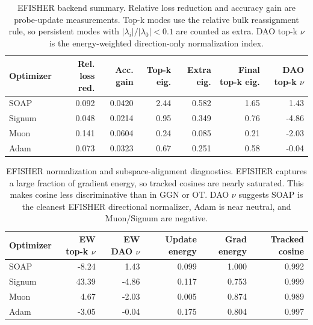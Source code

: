 \documentclass[11pt]{article}
\begin{document}
\begin{table}[htbp]
\centering
\small
\begin{tabular}{lrrrrrr}
\toprule
Optimizer & Rel. loss red. & Acc. gain & Top-k eig. & Extra eig. & Final top-k eig. & DAO top-k $\nu$ \\
\midrule
SOAP & 0.092 & 0.0420 & 2.44 & 0.582 & 1.65 & 1.43 \\
Signum & 0.048 & 0.0214 & 0.95 & 0.349 & 0.76 & -4.86 \\
Muon & 0.141 & 0.0604 & 0.24 & 0.085 & 0.21 & -2.03 \\
Adam & 0.073 & 0.0323 & 0.67 & 0.251 & 0.58 & -0.04 \\
\bottomrule
\end{tabular}
\caption{EFISHER backend summary. Relative loss reduction and accuracy gain are probe-update measurements. Top-k modes use the relative bulk reassignment rule, so persistent modes with $|\lambda_i|/|\lambda_0|<0.1$ are counted as extra. DAO top-k $\nu$ is the energy-weighted direction-only normalization index.}
\label{tab:efisher-summary}
\end{table}

\begin{table}[htbp]
\centering
\small
\begin{tabular}{lrrrrr}
\toprule
Optimizer & EW top-k $\nu$ & EW DAO $\nu$ & Update energy & Grad energy & Tracked cosine \\
\midrule
SOAP & -8.24 & 1.43 & 0.099 & 1.000 & 0.992 \\
Signum & 43.39 & -4.86 & 0.117 & 0.753 & 0.999 \\
Muon & 4.67 & -2.03 & 0.005 & 0.874 & 0.989 \\
Adam & -3.05 & -0.04 & 0.175 & 0.804 & 0.997 \\
\bottomrule
\end{tabular}
\caption{EFISHER normalization and subspace-alignment diagnostics. EFISHER captures a large fraction of gradient energy, so tracked cosines are nearly saturated. This makes cosine less discriminative than in GGN or OT. DAO $\nu$ suggests SOAP is the cleanest EFISHER directional normalizer, Adam is near neutral, and Muon/Signum are negative.}
\label{tab:efisher-normalization}
\end{table}
\end{document}
